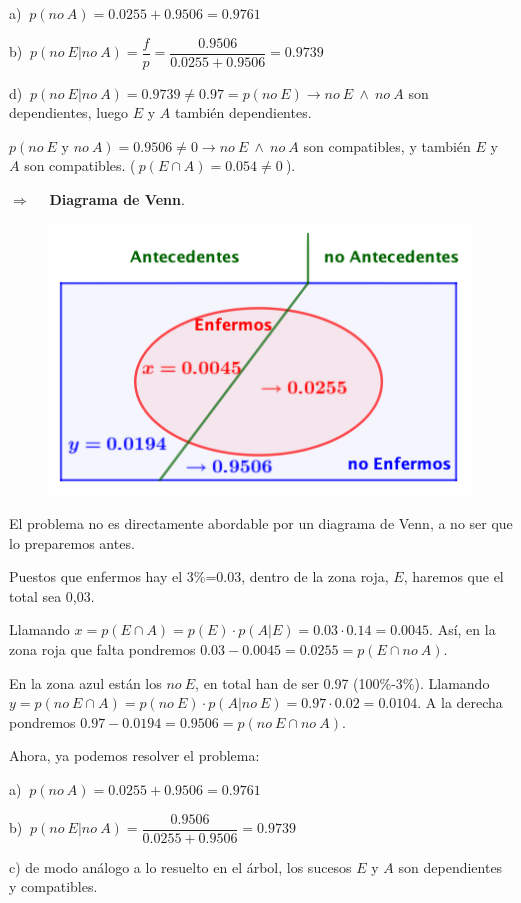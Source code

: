 \begin{example}
\begin{ejre}
a) $\ p(no \ A)=0.0255+0.9506=0.9761$

b) $\ p(no \ E|no \ A)=\dfrac f p =\dfrac{0.9506}{0.0255+0.9506}=0.9739$

d) $\ p(no \ E|no \ A)=0.9739\neq 0.97=p(no \ E) \to no\ E \ \wedge \ no \ A $ son dependientes, luego $E$ y $A$ también dependientes.

$p(no \ E \text{ y } no \ A)=0.9506\neq 0 \to no\ E \ \wedge \ no \ A$ son compatibles, y también $E$ y $A$ son compatibles. ($\ p(E\cap A)=0.054\neq 0\ $). 

\vspace{4mm} $\boldsymbol{\Rightarrow}\quad $ \textbf{Diagrama de Venn}.

	\begin{figure}[H]
			\centering
			\includegraphics[width=.6\textwidth]{imagenes/imagenes02/T02IM25.png}
	\end{figure}


El problema no es directamente abordable por un diagrama de Venn, a no ser que lo preparemos antes.

Puestos que enfermos hay el 3\%=0.03, dentro de la zona roja, $E$, haremos que el total sea 0,03.

Llamando $x=p(E \cap A)=p(E)\cdot p(A|E)=0.03\cdot 0.14=0.0045$. Así, en la zona roja que falta pondremos $0.03-0.0045=0.0255=p(E\cap no\ A)$.

En la zona azul están los $no\ E$, en total han de ser 0.97 (100\%-3\%). Llamando $y=p(no\ E \cap A)=p(no\ E)\cdot p(A|no\ E)=0.97\cdot 0.02=0.0104$. A la derecha pondremos $0.97-0.0194=0.9506=p(no\ E\cap no\ A)$.

Ahora, ya podemos resolver el problema:

a) $\ p(no \ A)=0.0255+0.9506=0.9761$

b) $\ p(no\ E|no\ A)=\dfrac{0.9506}{0.0255+0.9506}=0.9739$

c) de modo análogo a lo resuelto en el árbol, los sucesos $E$ y $A$ son dependientes y compatibles. 


\end{ejre}
\end{example}
